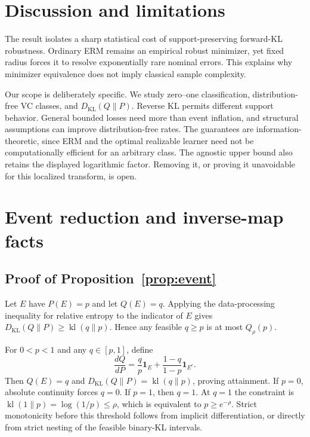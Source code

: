 \documentclass{article}
\theoremstyle{remark}
\newcommand{\KL}{D_{\mathrm{KL}}}
\newcommand{\kl}{\operatorname{kl}}
\begin{document}
\section{Discussion and limitations}

The result isolates a sharp statistical cost of support-preserving forward-KL robustness.  Ordinary ERM remains an empirical robust minimizer, yet fixed radius forces it to resolve exponentially rare nominal errors.  This explains why minimizer equivalence does not imply classical sample complexity.

Our scope is deliberately specific.  We study zero--one classification, distribution-free VC classes, and $D_{\mathrm{KL}}(Q\|P)$.  Reverse KL permits different support behavior.  General bounded losses need more than event inflation, and structural assumptions can improve distribution-free rates. The guarantees are information-theoretic, since ERM and the optimal realizable learner need not be computationally efficient for an arbitrary class.  The agnostic upper bound also retains the displayed logarithmic factor.  Removing it, or proving it unavoidable for this localized transform, is open.




\appendix

\section{Event reduction and inverse-map facts}
\label{app:event}

\subsection{Proof of Proposition~\ref{prop:event}}

Let $E$ have $P(E)=p$ and let $Q(E)=q$.  Applying the data-processing inequality for relative entropy to the indicator of $E$ gives $\KL(Q\|P)\ge\kl(q\|p)$.  Hence any feasible $q\ge p$ is at most $Q_\rho(p)$.

For $0<p<1$ and any $q\in[p,1]$, define \[ \frac{dQ}{dP}=\frac qp\mathbf 1_E+ \frac{1-q}{1-p}\mathbf 1_{E^c}. \] Then $Q(E)=q$ and $\KL(Q\|P)=\kl(q\|p)$, proving attainment.  If $p=0$, absolute continuity forces $q=0$.  If $p=1$, then $q=1$.  At $q=1$ the constraint is $\kl(1\|p)=\log(1/p)\le\rho$, which is equivalent to $p\ge e^{-\rho}$.  Strict monotonicity before this threshold follows from implicit differentiation, or directly from strict nesting of the feasible binary-KL intervals.
\end{document}
